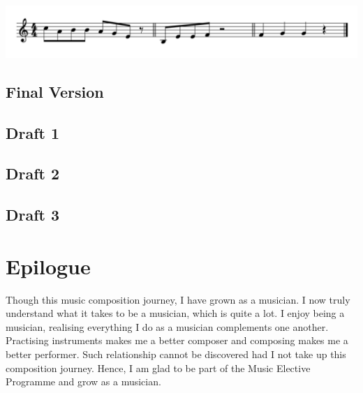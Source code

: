 \documentclass{article}
\newcommand\emptypage{
    \null
    \thispagestyle{empty}
    \newpage
    }
\begin{document}
\includegraphics[width=\textwidth]{d.png}

\newpage
\begin{center}
\vspace*{\fill}
\LARGE
\subsection{Final Version}
\vspace*{\fill}
%
\end{center}

\newpage
\begin{center}
\vspace*{\fill}
\LARGE
\subsection{Draft 1}
\vspace*{\fill}
%
\end{center}
\newpage
\emptypage
\emptypage
\emptypage
\emptypage
\emptypage
\emptypage
\emptypage
\emptypage
\emptypage
\emptypage
\emptypage
\emptypage
\begin{center}
\vspace*{\fill}
\LARGE
\subsection{Draft 2}
\vspace*{\fill}
%
\end{center}
\newpage
\emptypage
\emptypage
\emptypage
\emptypage
\emptypage
\emptypage
\emptypage
\emptypage
\emptypage
\emptypage
\emptypage
\emptypage
\emptypage
\begin{center}
\vspace*{\fill}
\LARGE
\subsection{Draft 3}
\vspace*{\fill}
%
\end{center}
\newpage
\emptypage
\emptypage
\emptypage
\emptypage
\emptypage
\emptypage
\emptypage
\emptypage
\emptypage
\emptypage
\emptypage
\emptypage
\emptypage
\section{Epilogue}
Though this music composition journey, I have grown as a musician. I now truly understand
what it takes to be a musician, which is quite a lot. I enjoy being a musician, realising
everything I do as a musician complements one another. Practising instruments makes me
a better composer and composing makes me a better performer. Such relationship cannot be
discovered had I not take up this composition journey. Hence, I am glad to be part of
the Music Elective Programme and grow as a musician.
\end{document}
